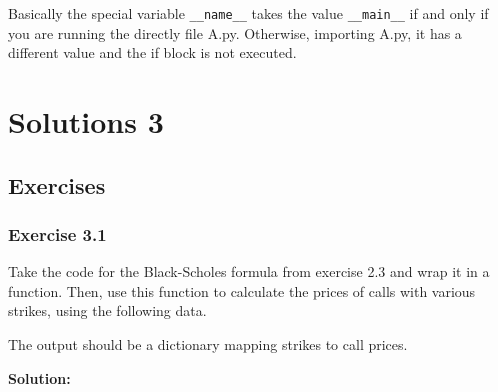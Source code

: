 \documentclass[11pt]{article}
\newenvironment{Shaded}{}{}
\newcommand{\DecValTok}[1]{\textcolor[rgb]{0.25,0.63,0.44}{{#1}}}
\newcommand{\FloatTok}[1]{\textcolor[rgb]{0.25,0.63,0.44}{{#1}}}
\newcommand{\CommentTok}[1]{\textcolor[rgb]{0.38,0.63,0.69}{\textit{{#1}}}}
\newcommand{\NormalTok}[1]{{#1}}
\newcommand{\OperatorTok}[1]{\textcolor[rgb]{0.40,0.40,0.40}{{#1}}}
\begin{document}
Basically the special variable \texttt{\_\_name\_\_} takes the value
\texttt{\_\_main\_\_} if and only if you are running the directly file
A.py. Otherwise, importing A.py, it has a different value and the if
block is not executed.

    \hypertarget{solutions---practical-lession-3}{%
\section{Solutions
3}\label{solutions---practical-lession-3}}

\hypertarget{exercises}{%
\subsection{Exercises}\label{exercises}}

\hypertarget{exercise-3.1}{%
\subsubsection{Exercise 3.1}\label{exercise-3.1}}

Take the code for the Black-Scholes formula from exercise 2.3 and wrap
it in a function. Then, use this function to calculate the prices of
calls with various strikes, using the following data.

\begin{Shaded}
\end{Shaded}

The output should be a dictionary mapping strikes to call prices.

\textbf{Solution:}
\end{document}
